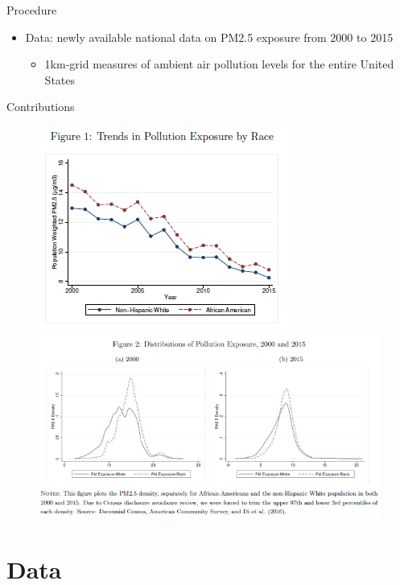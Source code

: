 \documentclass[dvipdfmx,12pt]{beamer}
\begin{document}
\begin{frame}{Procedure}
  \begin{itemize}
    \item Data: newly available national data on PM2.5 exposure from 2000 to 2015
    \begin{itemize}
      \item 1km-grid measures of ambient air pollution levels for the entire United States
    \end{itemize}
  \end{itemize}
\end{frame}

\begin{frame}{Contributions}
  
\end{frame}

\begin{frame}{}
  \begin{figure}
    \centering
    \includegraphics[scale = .5]{F1.png}
    \includegraphics[scale = .5]{F2.png}
  \end{figure}
\end{frame}

\section{Data}
\frame{\sectionpage}
\begin{frame}{}

\end{frame}
\end{document}
